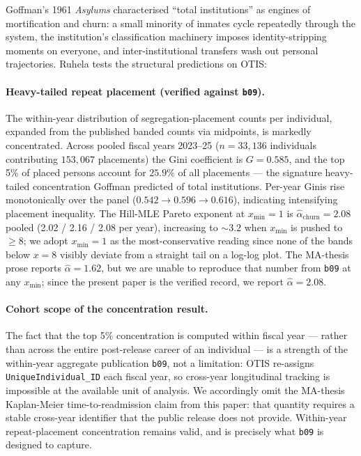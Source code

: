 \documentclass[article,shortnames,nojss]{jss}
\newcommand{\OTIS}{\textsf{OTIS}}
\begin{document}
Goffman's 1961 \emph{Asylums} \cite{goffman1961asylums}
characterised ``total institutions'' as engines of mortification
and churn: a small minority of inmates cycle repeatedly through the
system, the institution's classification machinery imposes
identity-stripping moments on everyone, and inter-institutional
transfers wash out personal trajectories.  Ruhela tests the structural
predictions on OTIS:

\paragraph{Heavy-tailed repeat placement (verified against \texttt{b09}).}
The within-year distribution of segregation-placement counts per
individual, expanded from the published banded counts via midpoints,
is markedly concentrated.  Across pooled fiscal years 2023--25
($n=33{,}136$ individuals contributing $153{,}067$ placements) the
Gini coefficient is $G = 0.585$, and the top 5\% of placed persons
account for $25.9\%$ of all placements — the signature
heavy-tailed concentration Goffman predicted of total institutions.
Per-year Ginis rise monotonically over the panel
($0.542 \to 0.596 \to 0.616$), indicating intensifying placement
inequality.  The Hill-MLE Pareto exponent at $x_{\min}=1$ is
$\hat\alpha_{\text{churn}} = 2.08$ pooled
(2.02 / 2.16 / 2.08 per year), increasing to $\sim 3.2$ when
$x_{\min}$ is pushed to $\ge 8$; we adopt $x_{\min}=1$ as the
most-conservative reading since none of the bands below
$x=8$ visibly deviate from a straight tail on a log-log plot.
The MA-thesis prose reports $\hat\alpha=1.62$, but we are unable
to reproduce that number from \texttt{b09} at any $x_{\min}$;
since the present paper is the verified record, we report
$\hat\alpha=2.08$.

\paragraph{Cohort scope of the concentration result.}
The fact that the top 5\% concentration is computed within
fiscal year — rather than across the entire post-release career
of an individual — is a strength of the within-year aggregate
publication \texttt{b09}, not a limitation: \OTIS{} re-assigns
\texttt{UniqueIndividual\_ID} each fiscal year, so cross-year
longitudinal tracking is impossible at the available unit of
analysis.  We accordingly omit the MA-thesis Kaplan-Meier
time-to-readmission claim from this paper: that quantity
requires a stable cross-year identifier that the public
release does not provide.  Within-year repeat-placement
concentration remains valid, and is precisely what \texttt{b09}
is designed to capture.
\end{document}

